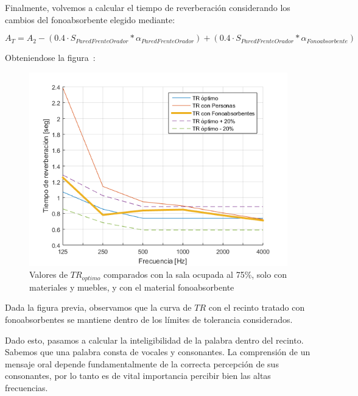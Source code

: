 \par Finalmente, volvemos a calcular el tiempo de reverberación considerando los cambios del fonoabsorbente elegido mediante:

\begin{equation}
    A_T = A_2 - (0.4 \cdot S_{ParedFrenteOrador} * \alpha_{ParedFrenteOrador}) + (0.4 \cdot S_{ParedFrenteOrador} * \alpha_{Fonoabsorbente})
\end{equation}

\par Obteniendose la figura~:

\begin{figure}[H]
	\centering
	\includegraphics[width=1\textwidth]{./img/TR_conFonoabsorbentes.png}
	\caption{Valores de $TR_{optimo}$ comparados con la sala ocupada al 75\%, solo con materiales y muebles, y con el material fonoabsorbente}
	\label{fig:TR_fonoabsorbente}
\end{figure}

\par Dada la figura previa, observamos que la curva de $TR$ con el recinto tratado con fonoabsorbentes se mantiene dentro de los límites de tolerancia considerados.

\par Dado esto, pasamos a calcular la inteligibilidad de la palabra dentro del recinto. Sabemos que una palabra consta de vocales y consonantes. La comprensión de un mensaje oral depende fundamentalmente de la correcta percepción de sus consonantes, por lo tanto es de vital importancia percibir bien las altas frecuencias.

